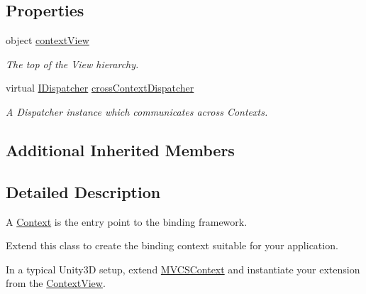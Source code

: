 \subsection*{Properties}
\begin{DoxyCompactItemize}
\item 
object \hyperlink{classstrange_1_1extensions_1_1context_1_1impl_1_1_context_a6403b0233cce89fdf38d810c740795c2}{context\-View}
\begin{DoxyCompactList}\small\item\em The top of the View hierarchy. \end{DoxyCompactList}\item 
\hypertarget{classstrange_1_1extensions_1_1context_1_1impl_1_1_context_a2358f952cd0785dbba2ba9a8258d300c}{virtual \hyperlink{interfacestrange_1_1extensions_1_1dispatcher_1_1api_1_1_i_dispatcher}{I\-Dispatcher} \hyperlink{classstrange_1_1extensions_1_1context_1_1impl_1_1_context_a2358f952cd0785dbba2ba9a8258d300c}{cross\-Context\-Dispatcher}}\label{classstrange_1_1extensions_1_1context_1_1impl_1_1_context_a2358f952cd0785dbba2ba9a8258d300c}

\begin{DoxyCompactList}\small\item\em A Dispatcher instance which communicates across Contexts. \end{DoxyCompactList}\end{DoxyCompactItemize}
\subsection*{Additional Inherited Members}


\subsection{Detailed Description}
A \hyperlink{classstrange_1_1extensions_1_1context_1_1impl_1_1_context}{Context} is the entry point to the binding framework. 

Extend this class to create the binding context suitable for your application.

In a typical Unity3\-D setup, extend \hyperlink{classstrange_1_1extensions_1_1context_1_1impl_1_1_m_v_c_s_context}{M\-V\-C\-S\-Context} and instantiate your extension from the \hyperlink{classstrange_1_1extensions_1_1context_1_1impl_1_1_context_view}{Context\-View}. 

